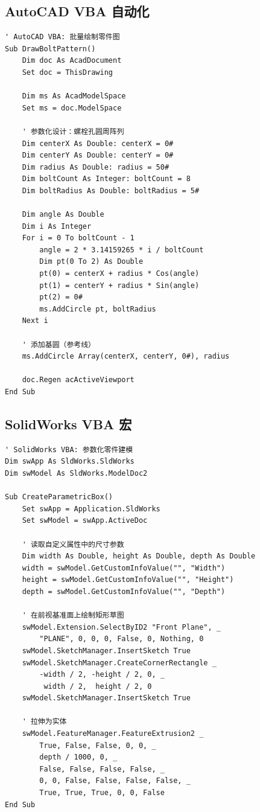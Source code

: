 \documentclass[12pt,a4paper,fontset=fandol]{ctexbook}
\begin{document}
\subsection{AutoCAD VBA 自动化}\label{sec:vba-autocad}

\begin{lstlisting}[style=csharpstyle]
' AutoCAD VBA: 批量绘制零件图
Sub DrawBoltPattern()
    Dim doc As AcadDocument
    Set doc = ThisDrawing

    Dim ms As AcadModelSpace
    Set ms = doc.ModelSpace

    ' 参数化设计：螺栓孔圆周阵列
    Dim centerX As Double: centerX = 0#
    Dim centerY As Double: centerY = 0#
    Dim radius As Double: radius = 50#
    Dim boltCount As Integer: boltCount = 8
    Dim boltRadius As Double: boltRadius = 5#

    Dim angle As Double
    Dim i As Integer
    For i = 0 To boltCount - 1
        angle = 2 * 3.14159265 * i / boltCount
        Dim pt(0 To 2) As Double
        pt(0) = centerX + radius * Cos(angle)
        pt(1) = centerY + radius * Sin(angle)
        pt(2) = 0#
        ms.AddCircle pt, boltRadius
    Next i

    ' 添加基圆（参考线）
    ms.AddCircle Array(centerX, centerY, 0#), radius

    doc.Regen acActiveViewport
End Sub
\end{lstlisting}

\subsection{SolidWorks VBA 宏}\label{sec:vba-solidworks}

\begin{lstlisting}[style=csharpstyle]
' SolidWorks VBA: 参数化零件建模
Dim swApp As SldWorks.SldWorks
Dim swModel As SldWorks.ModelDoc2

Sub CreateParametricBox()
    Set swApp = Application.SldWorks
    Set swModel = swApp.ActiveDoc

    ' 读取自定义属性中的尺寸参数
    Dim width As Double, height As Double, depth As Double
    width = swModel.GetCustomInfoValue("", "Width")
    height = swModel.GetCustomInfoValue("", "Height")
    depth = swModel.GetCustomInfoValue("", "Depth")

    ' 在前视基准面上绘制矩形草图
    swModel.Extension.SelectByID2 "Front Plane", _
        "PLANE", 0, 0, 0, False, 0, Nothing, 0
    swModel.SketchManager.InsertSketch True
    swModel.SketchManager.CreateCornerRectangle _
        -width / 2, -height / 2, 0, _
         width / 2,  height / 2, 0
    swModel.SketchManager.InsertSketch True

    ' 拉伸为实体
    swModel.FeatureManager.FeatureExtrusion2 _
        True, False, False, 0, 0, _
        depth / 1000, 0, _
        False, False, False, False, _
        0, 0, False, False, False, False, _
        True, True, True, 0, 0, False
End Sub
\end{lstlisting}
\end{document}
